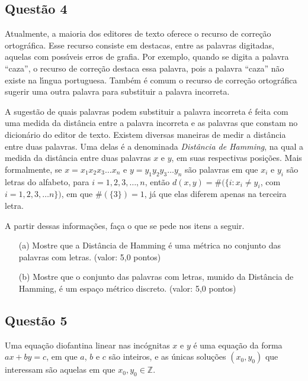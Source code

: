 \documentclass{report}
\begin{document}
\subsection{\color{blue} Quest\~ao 4}

Atualmente, a maioria dos editores de texto oferece o recurso de corre\c c\~ao ortogr\'afica. Esse recurso consiste em destacas, entre as palavras digitadas, aquelas com poss\'\i veis erros de grafia. Por exemplo, quando se digita a palavra ``caza'', o recurso de corre\c c\~ao destaca essa palavra, pois a palavra ``caza'' n\~ao existe na l\'\i ngua portuguesa. Tamb\'em \'e comum o recurso de corre\c c\~ao ortogr\'afica sugerir uma outra palavra para substituir a palavra incorreta.

A sugest\~ao de quais palavras podem substituir a palavra incorreta \'e feita com uma medida da dist\^ancia entre a palavra incorreta e as palavras que constam no dicion\'ario do editor de texto. Existem diversas maneiras de medir a dist\^ancia entre duas palavras. Uma delas \'e a denominada {\it Dist\^ancia de Hamming}, na qual a medida da dist\^ancia entre duas palavras $x$ e $y$, em suas respectivas posi\c c\~oes. Mais formalmente, se $x=x_1x_2x_3\ldots x_n$ e $y=y_1y_2y_3\ldots y_n$ s\~ao palavras em que $x_i$ e $y_i$ s\~ao letras do alfabeto, para $i=1,2,3,\ldots,n$, ent\~ao $d(x,y)=\#(\{i:x_i\neq y_i$, com $i=1,2,3,\ldots n\})$, em que $\#(\{3\})=1$, j\'a que elas diferem apenas na terceira letra.

A partir dessas informa\c c\~oes, fa\c ca o que se pede nos itens a seguir.

\begin{enumerate}

\item[(a)] Mostre que a Dist\^ancia de Hamming \'e uma m\'etrica no conjunto das palavras com letras. (valor: 5,0 pontos)

\item[(b)] Mostre que o conjunto das palavras com letras, munido da Dist\^ancia de Hamming, \'e um espa\c co m\'etrico discreto. (valor: 5,0 pontos)

\end{enumerate}

\subsection{\color{blue} Quest\~ao 5}

Uma equa\c c\~ao diofantina linear nas inc\'ognitas $x$ e $y$ \'e uma equa\c c\~ao da forma $ax+by=c$, em que $a$, $b$ e $c$ s\~ao inteiros, e as \'unicas solu\c c\~oes $(x_0,y_0)$ que interessam s\~ao aquelas em que $x_0, y_0 \in \mathbb Z$.
\end{document}
